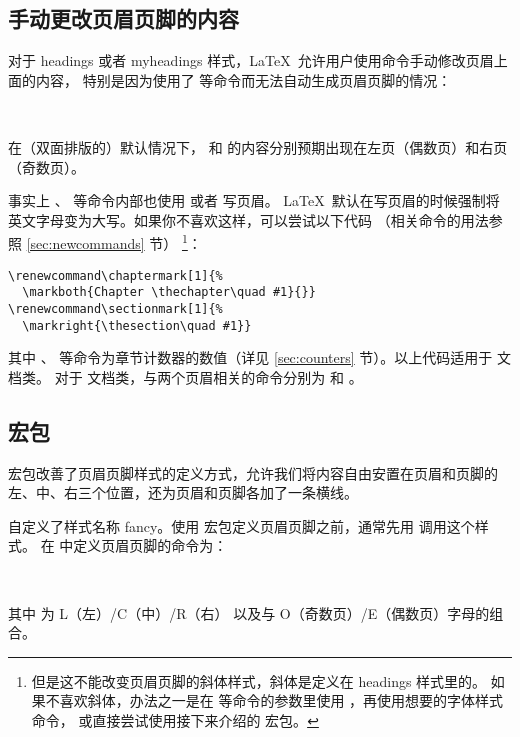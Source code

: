 \subsection{手动更改页眉页脚的内容}\label{subsec:marks}

对于 headings 或者 myheadings 样式，\LaTeX\ 允许用户使用命令手动修改页眉上面的内容，
特别是因为使用了  等命令而无法自动生成页眉页脚的情况：
\begin{command}
\\
\end{command}

在（双面排版的）默认情况下， 和  的内容分别预期出现在左页（偶数页）和右页（奇数页）。

事实上 、 等命令内部也使用  或者  写页眉。
\LaTeX\ 默认在写页眉的时候强制将英文字母变为大写。如果你不喜欢这样，可以尝试以下代码
（相关命令的用法参照 \ref{sec:newcommands} 节）%
\footnote{但是这不能改变页眉页脚的斜体样式，斜体是定义在 headings 样式里的。
如果不喜欢斜体，办法之一是在  等命令的参数里使用  ，再使用想要的字体样式命令，
或直接尝试使用接下来介绍的  宏包。}：
\begin{verbatim}
\renewcommand\chaptermark[1]{%
  \markboth{Chapter \thechapter\quad #1}{}}
\renewcommand\sectionmark[1]{%
  \markright{\thesection\quad #1}}
\end{verbatim}

其中 、 等命令为章节计数器的数值（详见 \ref{sec:counters} 节）。以上代码适用于  文档类。
对于  文档类，与两个页眉相关的命令分别为  和  。

\subsection{ 宏包}\label{subsec:fancyhdr}

 宏包改善了页眉页脚样式的定义方式，允许我们将内容自由安置在页眉和页脚的左、中、右三个位置，还为页眉和页脚各加了一条横线。

 自定义了样式名称 fancy。使用  宏包定义页眉页脚之前，通常先用  调用这个样式。
在  中定义页眉页脚的命令为：
\begin{command}
\marg*{\ldots}\\
\marg*{\ldots}
\end{command}
其中  为 L（左）/C（中）/R（右） 以及与 O（奇数页）/E（偶数页）字母的组合。

